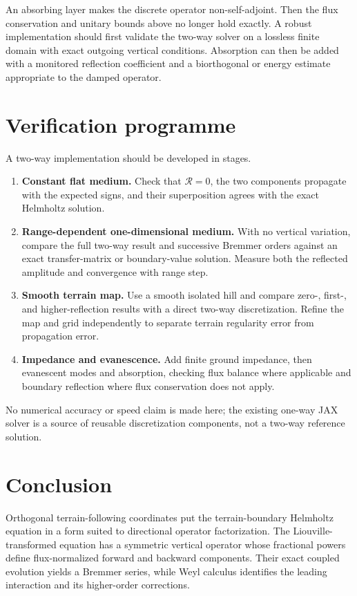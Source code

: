 \documentclass[11pt]{article}
\newcommand{\Rop}{\mathcal R}
\begin{document}
An absorbing layer makes the discrete operator non-self-adjoint. Then the
flux conservation and unitary bounds above no longer hold exactly. A robust
implementation should first validate the two-way solver on a lossless finite
domain with exact outgoing vertical conditions. Absorption can then be added
with a monitored reflection coefficient and a biorthogonal or energy estimate
appropriate to the damped operator.

\section{Verification programme}

A two-way implementation should be developed in stages.
\begin{enumerate}
\item \textbf{Constant flat medium.} Check that $\Rop=0$, the two components
  propagate with the expected signs, and their superposition agrees with the
  exact Helmholtz solution.
\item \textbf{Range-dependent one-dimensional medium.} With no vertical
  variation, compare the full two-way result and successive Bremmer orders
  against an exact transfer-matrix or boundary-value solution. Measure both
  the reflected amplitude and convergence with range step.
\item \textbf{Smooth terrain map.} Use a smooth isolated hill and compare
  zero-, first-, and higher-reflection results with a direct two-way
  discretization. Refine the map and grid independently to separate terrain
  regularity error from propagation error.
\item \textbf{Impedance and evanescence.} Add finite ground impedance, then
  evanescent modes and absorption, checking flux balance where applicable
  and boundary reflection where flux conservation does not apply.
\end{enumerate}
No numerical accuracy or speed claim is made here; the existing one-way JAX
solver is a source of reusable discretization components, not a two-way
reference solution.

\section{Conclusion}

Orthogonal terrain-following coordinates put the terrain-boundary Helmholtz
equation in a form suited to directional operator factorization. The
Liouville-transformed equation has a symmetric vertical operator whose
fractional powers define flux-normalized forward and backward components.
Their exact coupled evolution yields a Bremmer series, while Weyl calculus
identifies the leading interaction and its higher-order corrections.
\end{document}
